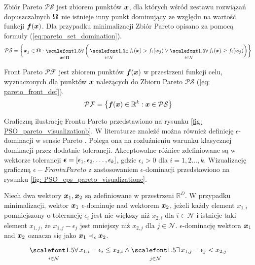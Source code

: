 \begin{definition}
	Zbiór Pareto $\mathcal{PS}$ jest zbiorem punktów $\bm{x}$, dla których wśród zestawu rozwiązań dopuszczalnych $\bm{\Omega}$ nie istnieje inny punkt dominujący ze względu na wartość funkcji $\bm{f}(\bm{x})$. Dla przypadku minimalizacji Zbiór Pareto opisano za pomocą formuły (\ref{eq:pareto_set_domination}). 
	\begin{equation} \label{eq:pareto_set_domination}
		\mathcal{PS} = \bigg\{ 
		\vect{x}_j \in \vect{\Omega}: 
		\bigforall_{\vect{x}\in\vect{\Omega}} \bigg( 
		\bigexists_{i\in\mathcal{N}} f_i(\vect{x})>f_i(\vect{x_j}) \vee
		\bigforall_{i\in\mathcal{N}} f_i(\vect{x})\ge f_i(\vect{x_j})
		\bigg) \bigg\}   
	\end{equation}
\end{definition}
\begin{definition}
	Front Pareto $\mathcal{PF}$ jest zbiorem punktów $\bm{f}(\bm{x})$ w przestrzeni funkcji celu, wyznaczonych dla punktów $\bm{x}$ należących do Zbioru Pareto $\mathcal{PS}$ (\ref{eq: pareto_front_def}).
	\begin{equation} \label{eq: pareto_front_def}
		\mathcal{PF} = \big\{ \bm{f}(\bm{x}) \in \mathbb{R}^k: \bm{x}\in \mathcal{PS} \big\}  
	\end{equation}
\end{definition}
Graficzną ilustrację Frontu Pareto przedstawiono na rysunku \ref{fig: PSO_pareto_visualizationb}.
W literaturze znaleźć można również definicję $\epsilon$-dominacji w sensie Pareto \parencite{Zuluaga2016}. Polega ona na rozluźnieniu warunku klasycznej dominacji przez dodatnie tolerancji. Akceptowalne różnice zdefiniowane są w wektorze tolerancji $\bm{\epsilon}=[\epsilon_1,\epsilon_2,\dots,\epsilon_k]$, gdzie $\epsilon_i>0$ dla $i=1,2\dots,k$. Wizualizację graficzną $\epsilon-Frontu Pareto$ z zastosowaniem $\epsilon$-dominacji przedstawiono na rysunku \ref{fig: PSO_eps_pareto_visualizationc}.

\begin{definition}
	Niech dwa wektory $\bm{x}_1, \bm{x}_2$ są zdefiniowane w przestrzeni $\mathbb{R}^D$. W przypadku minimalizacji, wektor $\bm{x}_1$ $\epsilon$-dominuje nad wektorem $\bm{x}_2$, jeżeli każdy element $x_{1,i}$ pomniejszony o tolerancję $\epsilon_i$ jest nie większy niż $x_{2,i}$ dla $i\in \mathcal{N}$ i istnieje taki element $x_{1,j}$, że $x_{1,j}-\epsilon_j$ jest mniejszy niż $x_{2,j}$ dla $j\in\mathcal{N}$. $\epsilon$-dominację wektora $\bm{x}_1$ nad $\bm{x}_2$ oznacza się jako $\bm{x}_1\prec_\epsilon\bm{x}_2$.
	\begin{equation}
		\bigforall_{i\in\mathcal{N}} x_{1,i}-\epsilon_i\le x_{2,i} \land \bigexists_{j\in\mathcal{N}} x_{1,j}-\epsilon_j<x_{2,j}
	\end{equation}
\end{definition}



